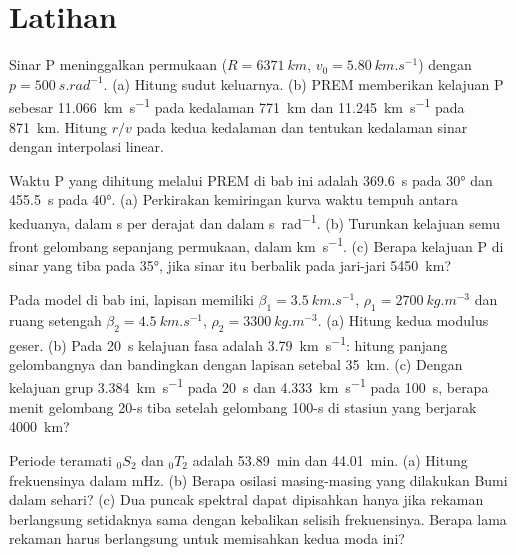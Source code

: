 \section{Latihan}

\begin{exercise}[$\star$]\label{exo:b3:seismology-imaging:1}
Sinar P meninggalkan permukaan ($R = \qty{6371}{km}$, $v_0 = \qty{5.80}{km.s^{-1}}$)
dengan  $p = \qty{500}{s.rad^{-1}}$. (a) Hitung sudut
keluarnya. (b) PREM memberikan kelajuan P sebesar \qty{11.066}{km.s^{-1}} pada kedalaman \qty{771}{km}
dan \qty{11.245}{km.s^{-1}} pada \qty{871}{km}. Hitung $r/v$ pada kedua kedalaman dan
tentukan kedalaman  sinar dengan interpolasi linear.
\end{exercise}

\begin{exercise}[$\star$]\label{exo:b3:seismology-imaging:2}
Waktu P yang dihitung melalui PREM di bab ini adalah \qty{369.6}{s} pada \ang{30}
dan \qty{455.5}{s} pada \ang{40}. (a) Perkirakan kemiringan kurva waktu tempuh
antara keduanya, dalam \unit{s} per derajat dan dalam \unit{s.rad^{-1}}. (b) Turunkan
kelajuan semu front gelombang sepanjang permukaan, dalam
\unit{km.s^{-1}}. (c) Berapa kelajuan P di  sinar
yang tiba pada \ang{35}, jika sinar itu berbalik pada jari-jari \qty{5450}{km}?
\end{exercise}

\begin{exercise}[$\star$]\label{exo:b3:seismology-imaging:3}
Pada model  di bab ini, lapisan memiliki $\beta_1 =
\qty{3.5}{km.s^{-1}}$, $\rho_1 = \qty{2700}{kg.m^{-3}}$ dan ruang setengah
$\beta_2 = \qty{4.5}{km.s^{-1}}$, $\rho_2 = \qty{3300}{kg.m^{-3}}$.
(a) Hitung kedua modulus geser. (b) Pada \qty{20}{s} kelajuan fasa adalah
\qty{3.79}{km.s^{-1}}: hitung panjang gelombangnya dan bandingkan dengan lapisan
setebal \qty{35}{km}. (c) Dengan kelajuan grup \qty{3.384}{km.s^{-1}} pada
\qty{20}{s} dan \qty{4.333}{km.s^{-1}} pada \qty{100}{s}, berapa menit
gelombang 20-s tiba setelah gelombang 100-s di stasiun yang berjarak \qty{4000}{km}?
\end{exercise}

\begin{exercise}[$\star$]\label{exo:b3:seismology-imaging:4}
Periode teramati ${}_0S_2$ dan ${}_0T_2$ adalah \qty{53.89}{min} dan
\qty{44.01}{min}. (a) Hitung frekuensinya dalam \unit{mHz}. (b) Berapa
osilasi masing-masing yang dilakukan Bumi dalam sehari? (c) Dua puncak spektral
dapat dipisahkan hanya jika rekaman berlangsung setidaknya sama dengan kebalikan
selisih frekuensinya. Berapa lama rekaman harus berlangsung untuk memisahkan kedua moda ini?
\end{exercise}

